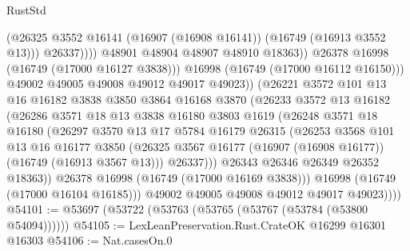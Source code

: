 \begin{lexlean}{RustStd}
\begin{coremodule}
                                  (@26325
                                    @3552
                                    @16141
                                    (@16907 (@16908 @16141))
                                    (@16749 (@16913 @3552 @13)))
                                  @26337))))
                          @48901
                          @48904
                          @48907
                          @48910
                          @18363))
                      @26378
                      @16998
                      (@16749 (@17000 @16127 @3838)))
                    @16998
                    (@16749 (@17000 @16112 @16150)))
                  @49002
                  @49005
                  @49008
                  @49012
                  @49017
                  @49023))
              (@26221
                @3572
                @101
                @13
                @16
                @16182
                @3838
                @3850
                @3864
                @16168
                @3870
                (@26233
                  @3572
                  @13
                  @16182
                  (@26286
                    @3571
                    @18
                    @13
                    @3838
                    @16180
                    @3803
                    @1619
                    (@26248
                      @3571
                      @18
                      @16180
                      (@26297
                        @3570
                        @13
                        @17
                        @5784
                        @16179
                        @26315
                        (@26253
                          @3568
                          @101
                          @13
                          @16
                          @16177
                          @3850
                          (@26325 @3567 @16177 (@16907 (@16908 @16177)) (@16749 (@16913 @3567 @13)))
                          @26337)))
                    @26343
                    @26346
                    @26349
                    @26352
                    @18363))
                @26378
                @16998
                (@16749 (@17000 @16169 @3838)))
              @16998
              (@16749 (@17000 @16104 @16185)))
            @49002
            @49005
            @49008
            @49012
            @49017
            @49023))))
@54101 := @53697 (@53722 (@53763 (@53765 (@53767 (@53784 (@53800 @54094))))))
@54105 := LexLeanPreservation.Rust.CrateOK @16299 @16301 @16303
@54106 := Nat.casesOn.{0}

\end{coremodule}
\end{lexlean}
